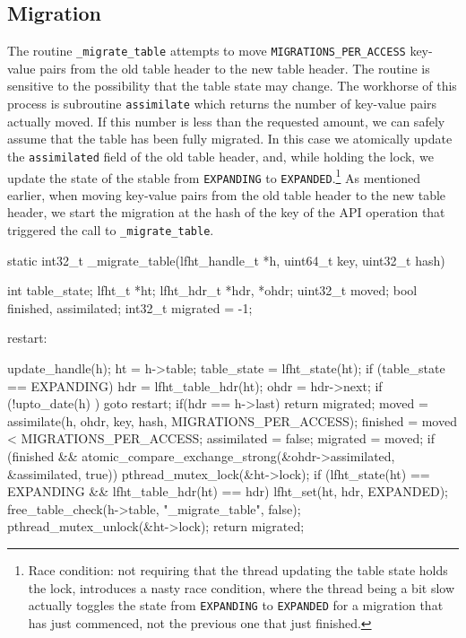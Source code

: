 \subsection{Migration}

The routine \texttt{\_migrate\_table} attempts to move
\texttt{MIGRATIONS\_PER\_ACCESS} key-value pairs from the old table
header to the new table header. The routine is sensitive to the
possibility that the table state may change.  The workhorse of this
process is subroutine \texttt{assimilate} which returns the number of
key-value pairs actually moved.  If this number is less than the
requested amount, we can safely assume that the table has been fully
migrated. In this case we atomically update the \texttt{assimilated}
field of the old table header, and, while holding the lock,
we update the state of the stable from \texttt{EXPANDING} to
\texttt{EXPANDED}.\footnote{Race condition: not requiring that the
  thread updating the table state holds the lock, introduces a nasty
  race condition, where the thread being a bit slow actually toggles
  the state from \texttt{EXPANDING} to \texttt{EXPANDED} for a
  migration that has just commenced, not the previous one that just
  finished.}  As mentioned earlier, when moving key-value pairs from
the old table header to the new table header, we start the
migration at the hash of the key of the API operation that triggered
the call to \texttt{\_migrate\_table}.




\begin{center}
\begin{clisting}
static int32_t _migrate_table(lfht_handle_t *h, uint64_t key, uint32_t hash){
  int table_state;
  lfht_t *ht;
  lfht_hdr_t *hdr, *ohdr;
  uint32_t moved;
  bool finished, assimilated;
  int32_t migrated = -1;
  
 restart:

  update_handle(h);
  ht = h->table;
  table_state = lfht_state(ht);
  if (table_state == EXPANDING){
    hdr = lfht_table_hdr(ht);
    ohdr = hdr->next;
    if (!upto_date(h) ){ goto restart; }
    if(hdr == h->last){ return migrated; }
    moved = assimilate(h, ohdr, key, hash,  MIGRATIONS_PER_ACCESS);
    finished = moved < MIGRATIONS_PER_ACCESS;
    assimilated = false;
    migrated = moved;
    if (finished  &&  atomic_compare_exchange_strong(&ohdr->assimilated, &assimilated, true)){
      pthread_mutex_lock(&ht->lock);
      if (lfht_state(ht) == EXPANDING  && lfht_table_hdr(ht) == hdr){
	lfht_set(ht, hdr, EXPANDED);
        free_table_check(h->table, "_migrate_table", false);
      }
      pthread_mutex_unlock(&ht->lock);
    }
  }
  return migrated;
}
\end{clisting}
\end{center}

